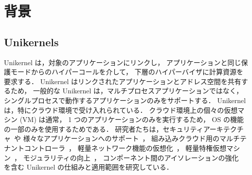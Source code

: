\section{背景} \label{sec:background}


\subsection{Unikernels}

Unikernel は，対象のアプリケーションにリンクし，
アプリケーションと同じ保護モードからのハイパーコールを介して，
下層のハイパーバイザに計算資源を要求する．
Unikernel はリンクされたアプリケーションとアドレス空間を共有するため，
一般的な Unikernel は，マルチプロセスアプリケーションではなく，
シングルプロセスで動作するアプリケーションのみをサポートする．
Unikernel は，特にクラウド環境で受け入れられている．
クラウド環境上の個々の仮想マシン (VM) は通常，
1 つのアプリケーションのみを実行するため，
OS の機能の一部のみを使用するためである．
研究者たちは，セキュリティアーキテクチャ~\cite{MadhavapeddyEtAl-Unikernel}や
様々なアプリケーションへのサポート~\cite{KivityEtAl-OSv,ZhangEtAl-Kylinx,WilliamsEtAl-SoCC18,OlivierEtAl-VEE19}，
組み込みクラウド用のマルチテナントコントローラ~\cite{MadhavepeddyEtAl-Jitsu}，
軽量ネットワーク機能の仮想化~\cite{MartinsEtAl-NSDI14}，
軽量特権仮想マシン~\cite{MehrabEtAl-Kite}，
モジュラリティの向上~\cite{KuenzerEtAl-Unikraft,KuenzerEtAl-SYSTOR19}，
コンポーネント間のアイソレーションの強化~\cite{LefeuvreEtAl-FlexOS,SartakovEtAl-ASPLOS21}
を含む Unikernel の仕組みと適用範囲を研究している．

